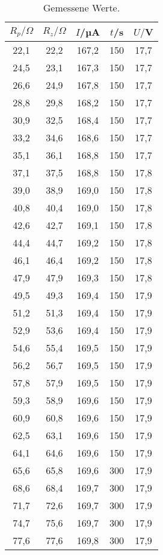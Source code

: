\begin{table}[htp]
  \label{tab:messwerte}
	\begin{center}
    \caption{Gemessene Werte.}
		\begin{tabular}{ccccc}
    		\toprule
			{$R_p/\Omega$} & {$R_z/\Omega$} & {$I$/µA} & {$t$/s} & {$U/$V}\\
			\midrule
			22,1 & 22,2 & 167,2 & 150 & 17,7\\
			24,5 & 23,1 & 167,3 & 150 & 17,7\\
			26,6 & 24,9 & 167,8 & 150 & 17,7\\
			28,8 & 29,8 & 168,2 & 150 & 17,7\\
			30,9 & 32,5 & 168,4 & 150 & 17,7\\
			33,2 & 34,6 & 168,6 & 150 & 17,7\\
			35,1 & 36,1 & 168,8 & 150 & 17,7\\
			37,1 & 37,5 & 168,8 & 150 & 17,8\\
			39,0 & 38,9 & 169,0 & 150 & 17,8\\
			40,8 & 40,4 & 169,0 & 150 & 17,8\\
			42,6 & 42,7 & 169,1 & 150 & 17,8\\
			44,4 & 44,7 & 169,2 & 150 & 17,8\\
			46,1 & 46,4 & 169,2 & 150 & 17,8\\
			47,9 & 47,9 & 169,3 & 150 & 17,8\\
			49,5 & 49,3 & 169,4 & 150 & 17,9\\
			51,2 & 51,3 & 169,4 & 150 & 17,9\\
			52,9 & 53,6 & 169,4 & 150 & 17,9\\
			54,6 & 55,4 & 169,5 & 150 & 17,9\\
			56,2 & 56,7 & 169,5 & 150 & 17,9\\
			57,8 & 57,9 & 169,5 & 150 & 17,9\\
			59,3 & 58,9 & 169,6 & 150 & 17,9\\
			60,9 & 60,8 & 169,6 & 150 & 17,9\\
			62,5 & 63,1 & 169,6 & 150 & 17,9\\
			64,1 & 64,6 & 169,6 & 150 & 17,9\\
			65,6 & 65,8 & 169,6 & 300 & 17,9\\
			68,6 & 68,4 & 169,7 & 300 & 17,9\\
			71,7 & 72,6 & 169,7 & 300 & 17,9\\
			74,7 & 75,6 & 169,7 & 300 & 17,9\\
			77,6 & 77,6 & 169,8 & 300 & 17,9\\

\end{tabular}
\end{center}
\end{table}
